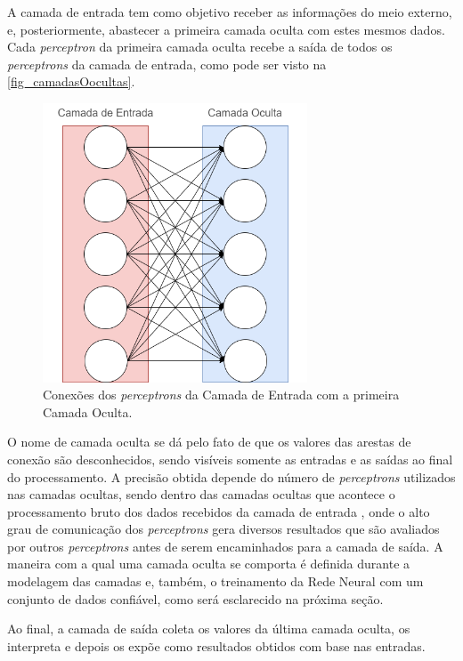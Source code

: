 A camada de entrada tem como objetivo receber as informações do meio 
externo, e, posteriormente, abastecer a primeira camada oculta com estes mesmos 
dados. Cada \textit{perceptron} da primeira camada oculta recebe a saída de todos os 
\textit{perceptrons} da camada de entrada, como pode ser visto na \autoref{fig_camadasOocultas}.

\begin{figure}[htb]
        \centering
        \caption{\label{fig_camadasOocultas}Conex{\~o}es dos \textit{perceptrons} da Camada de Entrada com a primeira Camada Oculta.}
        \includegraphics[width=0.7\textwidth]{images/CamadasOcultas.png}
\end{figure}

O nome de camada oculta se dá pelo fato de que os valores das arestas de 
conexão são desconhecidos, sendo visíveis somente as entradas e as saídas ao final 
do processamento. A precisão obtida depende do número de \textit{perceptrons} utilizados 
nas camadas ocultas, sendo dentro das camadas ocultas que acontece o 
processamento bruto dos dados recebidos da camada de entrada \cite{liu2008uso}, 
onde o alto grau de comunicação dos \textit{perceptrons} gera diversos resultados 
que são avaliados por outros \textit{perceptrons} antes de serem encaminhados para a 
camada de saída. A maneira com a qual uma camada oculta se comporta é definida 
durante a modelagem das camadas e, também, o treinamento da Rede Neural com 
um conjunto de dados confiável, como será esclarecido na próxima seção.

Ao final, a camada de saída coleta os valores da última camada oculta, os 
interpreta e depois os expõe como resultados obtidos com base nas entradas.

